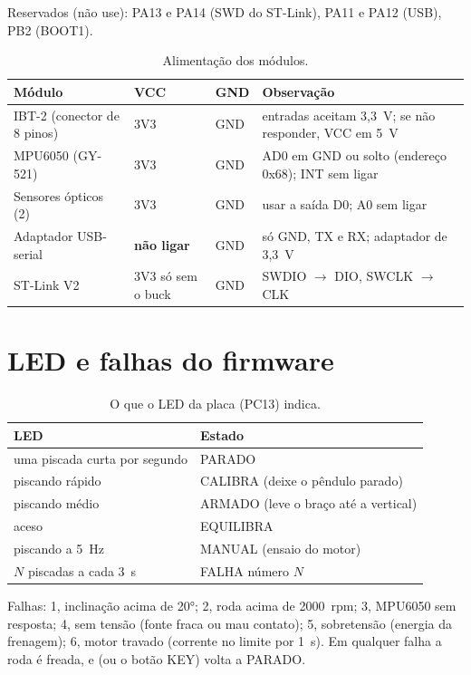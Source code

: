 \documentclass[11pt,a4paper]{article}
\newcommand{\cmd}[1]{\texttt{\detokenize{#1}}}   %
\newcommand{\flecha}{\ensuremath{\rightarrow}}
\begin{document}
Reservados (não use): PA13 e PA14 (SWD do ST-Link), PA11 e PA12 (USB), PB2 (BOOT1).

\begin{table}[H]
\centering\small
\caption{Alimentação dos módulos.}
\label{tab:modulos}
\begin{tabularx}{\textwidth}{@{}>{\raggedright\arraybackslash}p{4.2cm}ll>{\raggedright\arraybackslash}X@{}}
\toprule
Módulo & VCC & GND & Observação \\
\midrule
IBT-2 (conector de 8 pinos) & 3V3 & GND & entradas aceitam 3,3~V; se não responder,
  VCC em 5~V \\
MPU6050 (GY-521) & 3V3 & GND & AD0 em GND ou solto (endereço 0x68); INT sem ligar \\
Sensores ópticos (2) & 3V3 & GND & usar a saída D0; A0 sem ligar \\
Adaptador USB-serial & \textbf{não ligar} & GND & só GND, TX e RX; adaptador de 3,3~V \\
ST-Link V2 & 3V3 só sem o buck & GND & SWDIO \flecha{} DIO, SWCLK \flecha{} CLK \\
\bottomrule
\end{tabularx}
\end{table}

\section{LED e falhas do firmware}
\label{ap:led}

\begin{table}[H]
\centering\small
\caption{O que o LED da placa (PC13) indica.}
\label{tab:led}
\begin{tabular}{@{}ll@{}}
\toprule
LED & Estado \\
\midrule
uma piscada curta por segundo & PARADO \\
piscando rápido & CALIBRA (deixe o pêndulo parado) \\
piscando médio & ARMADO (leve o braço até a vertical) \\
aceso & EQUILIBRA \\
piscando a 5~Hz & MANUAL (ensaio do motor) \\
$N$ piscadas a cada 3~s & FALHA número $N$ \\
\bottomrule
\end{tabular}
\end{table}

Falhas: 1, inclinação acima de 20°; 2, roda acima de 2000~rpm; 3, MPU6050 sem resposta;
4, sem tensão (fonte fraca ou mau contato); 5, sobretensão (energia da
frenagem); 6, motor travado (corrente no limite por 1~s). Em qualquer falha a roda é
freada, e \cmd{s} (ou o botão KEY) volta a PARADO.
\end{document}
